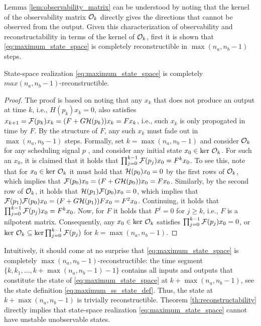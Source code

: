 Lemma \ref{lem:observability_matrix} can be understood by noting that the kernel of the observability matrix $\mathcal{O}_k$ directly gives the directions that cannot be observed from the output. Given this characterization of observability and reconstructability in terms of the kernel of $\mathcal{O}_k$, first it is shown that \eqref{eq:maximum_state_space} is completely reconstructible in $\max(n_a,n_b-1)$ steps.
\begin{theorem}\label{th:reconstructability}
    State-space realization \eqref{eq:maximum_state_space} is completely $max(n_a,n_b-1)$-reconstructible.
\end{theorem}
\begin{proof}
The proof is based on noting that any $x_k$ that does not produce an output at time $k$, i.e., $H(p_k) x_k =0$, also satisfies $x_{k+1} = \mathcal{F}(p_k)x_k = (F+G\mathcal{H}(p_k))x_k = F x_k$, i.e., such $x_k$ is only propogated in time by $F$. By the structure of $F$, any such $x_k$ must fade out in $\max(n_a,n_b-1)$ steps. Formally, set $k = \max(n_a,n_b-1)$ and consider $\mathcal{O}_k$ for any scheduling signal $p$%
, and consider any initial state $x_{0} \in\text{ker}\ \mathcal{O}_k$. For such an $x_0$, it is claimed that it holds that $\prod_{j=0}^{k-1}\mathcal{F}(p_j) x_0 = F^{k} x_0$. To see this, note that for $x_0 \in \text{ker}\ \mathcal{O}_k$ it must hold that $\mathcal{H}(p_0) x_0 = 0$ by the first rows of $\mathcal{O}_k$, which implies that $\mathcal{F}(p_0) x_0 = (F + G \mathcal{H}(p_0)) x_0 = F x_0$. Similarly, by the second row of $\mathcal{O}_k$, it holds that $\mathcal{H}(p_1) \mathcal{F}(p_0) x_0 = 0$, which implies that $\mathcal{F}(p_1) \mathcal{F}(p_0) x_0 = (F+G\mathcal{H}(p_1)) F x_0 = F^2 x_0$. Continuing, it holds that $\prod_{j=0}^{k-1} \mathcal{F}(p_j) x_0 = F^{k} x_0$. Now, for $F$ it holds that $F^{j} = 0$ for $j\geq k$, i.e., $F$ is a nilpotent matrix. Consequently, any $x_0 \in\text{ker}\ \mathcal{O}_k$ satisfies $\prod_{j=0}^{k-1} \mathcal{F}(p_j) x_0 = 0$, or $\text{ker}\ \mathcal{O}_k \subseteq \text{ker}\prod_{j=0}^{k-1} \mathcal{F}(p_j)$ for $k = \max(n_a,n_b-1)$.
\end{proof}

Intuitively, it should come at no surprise that \eqref{eq:maximum_state_space} is completely $\max(n_a,n_b-1)$-reconstructible: the time segment $\{k,k_1,\ldots,k\!+\max(n_a,n_b\!-\!1)\!-\!1\}$ contains all inputs and outputs that constitute the state of \eqref{eq:maximum_state_space} at $k+\max(n_a,n_b-1)$, see the state definition \eqref{eq:maximum_ss_state_def}. Thus, the state at $k+\max(n_a,n_b-1)$ is trivially reconstructible. Theorem \ref{th:reconstructability} directly implies that state-space realization \eqref{eq:maximum_state_space} cannot have unstable unobservable states.

